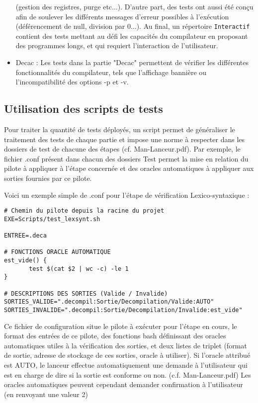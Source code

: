 \documentclass[11pt]{article}
\begin{document}
\begin{itemize}
(gestion des registres, purge etc...). D'autre part, des tests ont aussi été conçu afin de soulever les différents messages d'erreur possibles 
à l'exécution (déférencement de null, division par 0...). Au final, un répertoire \verb!Interactif! contient des tests mettant au
défi les capacités du compilateur en proposant des programmes longs, et qui requiert l'interaction de l'utilisateur.  
\item Decac : Les tests dans la partie "Decac" permettent de vérifier les différentes fonctionnalités du compilateur, tels que l'affichage bannière ou l'incompatibilité des options -p et -v. 
\end{itemize}

\subsection{Utilisation des scripts de tests}
Pour traiter la quantité de tests déployés, un script permet de généraliser le traitement des tests de chaque partie et impose une norme à respecter dans les dossiers de test de chacune des étapes (cf. Man-Lanceur.pdf). Par exemple, le fichier .conf présent dans chacun des dossiers Test permet la mise en relation du pilote à appliquer à l'étape concernée et des oracles automatiques à appliquer aux sorties fournies par ce pilote. 

Voici un exemple simple de .conf pour l'étape de vérification Lexico-syntaxique : \\
    \begin{lstlisting}
# Chemin du pilote depuis la racine du projet
EXE=Scripts/test_lexsynt.sh

ENTREE=.deca

# FONCTIONS ORACLE AUTOMATIQUE
est_vide() {
	   test $(cat $2 | wc -c) -le 1
}
	
# DESCRIPTIONS DES SORTIES (Valide / Invalide)
SORTIES_VALIDE=".decompil:Sortie/Decompilation/Valide:AUTO"
SORTIES_INVALIDE=".decompil:Sortie/Decompilation/Invalide:est_vide"
\end{lstlisting}

\hspace{1cm} Ce fichier de configuration situe le pilote à exécuter pour l'étape en cours, le format des entrées de ce pilote, des fonctions bash définissant des oracles automatiques utiles à la vérification des sorties, et deux listes de triplet (format de sortie, adresse de stockage de ces sorties, oracle à utiliser). Si l'oracle attribué est AUTO, le lanceur effectue automatiquement une demande à l'utilisateur qui est en charge de dire si la sortie est conforme ou non. (c.f. Man-Lanceur.pdf)
Les oracles automatiques peuvent cependant demander confirmation à l'utilisateur (en renvoyant une valeur 2)
\end{document}
